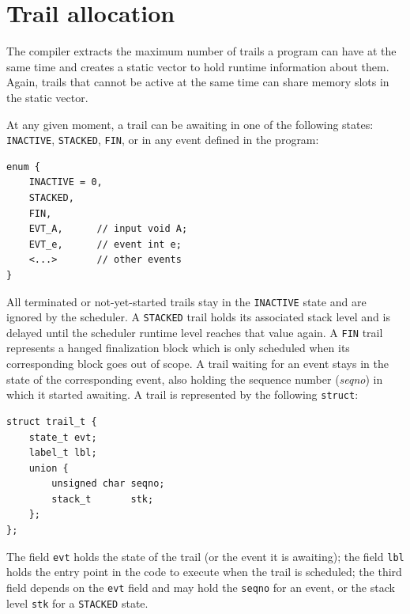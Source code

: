 \documentclass{sigplanconf}
\newcommand{\code}[1] {{\small{\texttt{#1}}}}
\newcommand{\1}{\;}
\newcommand{\2}{\;\;}
\newcommand{\3}{\;\;\;}
\newcommand{\5}{\;\;\;\;\;}
\begin{document}
\section{Trail allocation}
\label{sec:impl:gates}

The compiler extracts the maximum number of trails a program can have at the 
same time and creates a static vector to hold runtime information about them.
Again, trails that cannot be active at the same time can share memory slots in 
the static vector.

At any given moment, a trail can be awaiting in one of the following states: 
\code{INACTIVE}, \code{STACKED}, \code{FIN}, or in any event defined in the 
program:

\begin{lstlisting}
enum {
    INACTIVE = 0,
    STACKED,
    FIN,
    EVT_A,      // input void A;
    EVT_e,      // event int e;
    <...>       // other events
}
\end{lstlisting}

All terminated or not-yet-started trails stay in the \code{INACTIVE} state and 
are ignored by the scheduler.
%
A \code{STACKED} trail holds its associated stack level and is delayed until 
the scheduler runtime level reaches that value again.
%
A \code{FIN} trail represents a hanged finalization block which is only 
scheduled when its corresponding block goes out of scope.
%
A trail waiting for an event stays in the state of the corresponding event, 
also holding the sequence number (\emph{seqno}) in which it started awaiting.
%
A trail is represented by the following \code{struct}:

\begin{lstlisting}
struct trail_t {
    state_t evt;
    label_t lbl;
    union {
        unsigned char seqno;
        stack_t       stk;
    };
};
\end{lstlisting}

The field \code{evt} holds the state of the trail (or the event it is 
awaiting); the field \code{lbl} holds the entry point in the code to execute 
when the trail is scheduled; the third field depends on the \code{evt} field 
and may hold the \code{seqno} for an event, or the stack level \code{stk} for a
\code{STACKED} state.
\end{document}
